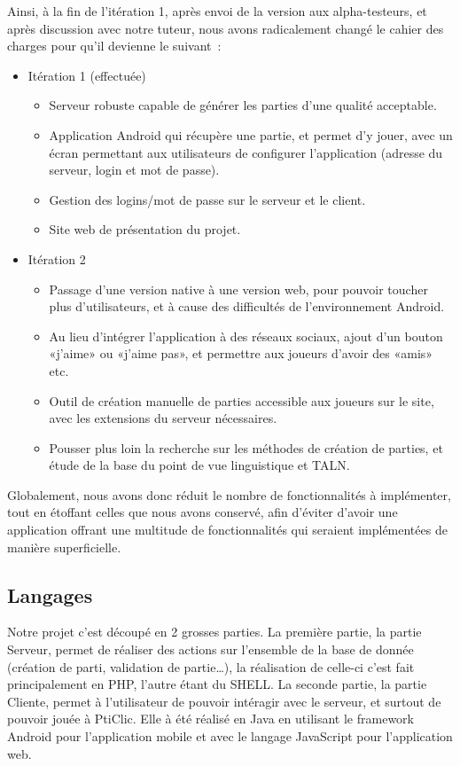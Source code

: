 \documentclass[a4paper,11pt,french]{article}
\def\android{Android\texttrademark{}}
\begin{document}
{Ainsi, à la fin de l'itération 1, après envoi de la version aux alpha-testeurs, et après discussion avec notre tuteur, nous avons
radicalement changé le cahier des charges pour qu'il devienne le suivant~:
\begin{itemize}
\item Itération 1 (effectuée)
  \begin{itemize}
  \item Serveur robuste capable de générer les parties d'une qualité acceptable.
  \item Application \android{} qui récupère une partie, et permet d'y jouer, avec un écran permettant aux utilisateurs de configurer
    l'application (adresse du serveur, login et mot de passe).
  \item Gestion des logins/mot de passe sur le serveur et le client.
  \item Site web de présentation du projet.
  \end{itemize}
\item Itération 2
  \begin{itemize}
  \item Passage d'une version native à une version web, pour pouvoir toucher plus d'utilisateurs, et à cause des difficultés de l'environnement Android.
  \item Au lieu d'intégrer l'application à des réseaux sociaux, ajout d'un bouton «j'aime» ou «j'aime pas», et permettre aux joueurs d'avoir des «amis» etc.
  \item Outil de création manuelle de parties accessible aux joueurs sur le site, avec les extensions du serveur nécessaires.
  \item Pousser plus loin la recherche sur les méthodes de création de parties, et étude de la base du point de vue linguistique et TALN.
  \end{itemize}
\end{itemize}

Globalement, nous avons donc réduit le nombre de fonctionnalités à implémenter, tout en étoffant celles que nous avons conservé, afin
d'éviter d'avoir une application offrant une multitude de fonctionnalités qui seraient implémentées de manière superficielle.

\subsection{Langages}
Notre projet c'est découpé en 2 grosses parties. La première partie, la \og{}partie Serveur\fg{}, permet de réaliser des actions sur l'ensemble de la base de donnée (création de parti, validation de partie\ldots),
la réalisation de celle-ci c'est fait principalement en PHP, l'autre étant du SHELL.
La seconde partie, la \og{}partie Cliente\fg{}, permet à l'utilisateur de pouvoir intéragir avec le serveur, et surtout de pouvoir jouée à PtiClic. Elle à été réalisé en Java en utilisant le framework \android{} pour l'application mobile et avec le langage JavaScript pour l'application web.

}
\end{document}
